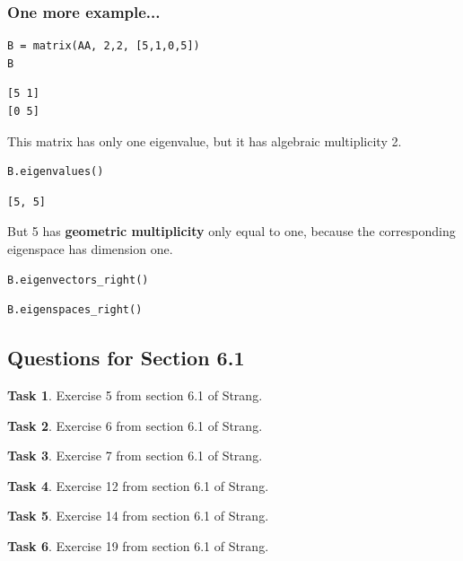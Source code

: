 \documentclass[10pt,]{book}
\newcommand{\terminology}[1]{\textbf{#1}}
\theoremstyle{plain}
\theoremstyle{definition}
\numberwithin{equation}{section}
\newtheorem{task}{Task}[chapter]
\begin{document}
\subsubsection[One more example...]{One more example...}\label{subsubsection-50}
\begin{lstlisting}[style=sageinput]
B = matrix(AA, 2,2, [5,1,0,5])
B
\end{lstlisting}
\begin{lstlisting}[style=sageoutput]
[5 1]
[0 5]
\end{lstlisting}
This matrix has only one eigenvalue, but it has algebraic multiplicity 2.%
\begin{lstlisting}[style=sageinput]
B.eigenvalues()
\end{lstlisting}
\begin{lstlisting}[style=sageoutput]
[5, 5]
\end{lstlisting}
\par
But 5 has \terminology{geometric multiplicity} only equal to one, because the corresponding
        eigenspace has dimension one.
\begin{lstlisting}[style=sageinput]
B.eigenvectors_right()
\end{lstlisting}
\begin{lstlisting}[style=sageinput]
B.eigenspaces_right()
\end{lstlisting}
\typeout{************************************************}
\typeout{************************************************}
\subsection[Questions for Section 6.1]{Questions for Section 6.1}\label{subsection-129}
\begin{task}
\label{task-158}
Exercise 5 from section 6.1 of Strang.
      \end{task}
\begin{task}
\label{task-159}
Exercise 6 from section 6.1 of Strang.
      \end{task}
\begin{task}
\label{task-160}
Exercise 7 from section 6.1 of Strang.
      \end{task}
\begin{task}
\label{task-161}
Exercise 12 from section 6.1 of Strang.
      \end{task}
\begin{task}
\label{task-162}
Exercise 14 from section 6.1 of Strang.
      \end{task}
\begin{task}
\label{task-163}
Exercise 19 from section 6.1 of Strang.
      \end{task}
\clearpage
\typeout{************************************************}
\typeout{************************************************}
\end{document}
